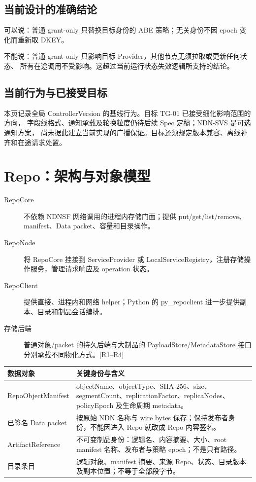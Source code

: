 \subsection{当前设计的准确结论}
可以说：普通 grant-only 只替换目标身份的 ABE 策略；无关身份不因 epoch
变化而重新取 DKEY。

不能说：普通 grant-only 只影响目标 Provider，其他节点无须拉取或更新任何状态、
所有在途调用不受影响。这超过当前运行状态失效逻辑所支持的结论。

\subsection{当前行为与已接受目标}
本页记录全局 ControllerVersion 的基线行为。目标 TG-01 已接受细化影响范围的方向，
字段线格式、通知承载及轮换粒度仍待后续 Spec 定稿；NDN-SVS 是可选通知方案，
尚未据此建立当前实现的广播保证。目标还须规定版本兼容、离线补齐和在途请求处置。

\newpage

\section{Repo：架构与对象模型}
\begin{description}
\item[RepoCore] 不依赖 NDNSF 网络调用的进程内存储门面；提供 put/get/list/remove、manifest、Data packet、容量和目录操作。
\item[RepoNode] 将 RepoCore 挂接到 ServiceProvider 或 LocalServiceRegistry，注册存储操作服务，管理请求响应及 operation 状态。
\item[RepoClient] 提供直接、进程内和网络 helper；Python 的 py\_repoclient 进一步提供副本、目录和制品会话编排。
\item[存储后端] 普通对象/packet 的持久后端与大制品的 PayloadStore/MetadataStore 接口分别承载不同物化方式。[R1--R4]
\end{description}

\begin{tabularx}{\linewidth}{@{}p{35mm}X@{}}
\toprule
数据对象 & 关键身份与含义 \\
\midrule
RepoObjectManifest & objectName、objectType、SHA-256、size、segmentCount、replicationFactor、replicaNodes、policyEpoch 及生命周期 metadata。\\
已签名 Data packet & 按原始 NDN 名称与 wire bytes 保存；保持发布者身份，不能因进入 Repo 就改成 Repo 内容签名。\\
ArtifactReference & 不可变制品身份：逻辑名、内容摘要、大小、root manifest 名称、发布者与策略 epoch；不是只有路径。\\
目录条目 & 逻辑对象、manifest 摘要、来源 Repo、状态、目录版本及副本位置；不等于全部段字节。\\
\bottomrule
\end{tabularx}

